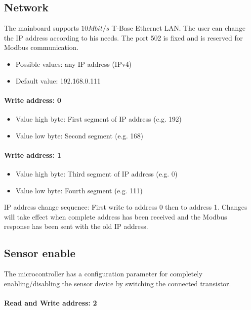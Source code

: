 \subsection{Network}
The mainboard supports $10 Mbit/s$ T-Base Ethernet LAN. The user can change the IP address according to his needs. The port 502 is fixed and is reserved for Modbus communication.

\begin{itemize}
    \item Possible values: any IP address (IPv4)
    \item Default value: 192.168.0.111
\end{itemize}

\paragraph{Write address: 0} 
\begin{itemize}
    \item Value high byte: First segment of IP address (e.g. 192)
    \item Value low byte: Second segment (e.g. 168)
\end{itemize}

\paragraph{Write address: 1} 
\begin{itemize}
    \item Value high byte: Third segment of IP address (e.g. 0)
    \item  Value low byte: Fourth segment (e.g. 111)
\end{itemize}

IP address change sequence: First write to address 0 then to address 1. Changes will take effect when complete address has been received and the Modbus response has been sent with the old IP address.

\subsection{Sensor enable}
\label{sec:sensor_enable}
The microcontroller has a configuration parameter for completely enabling/disabling the sensor device by switching the connected transistor. 

\paragraph{Read and Write address: 2}
